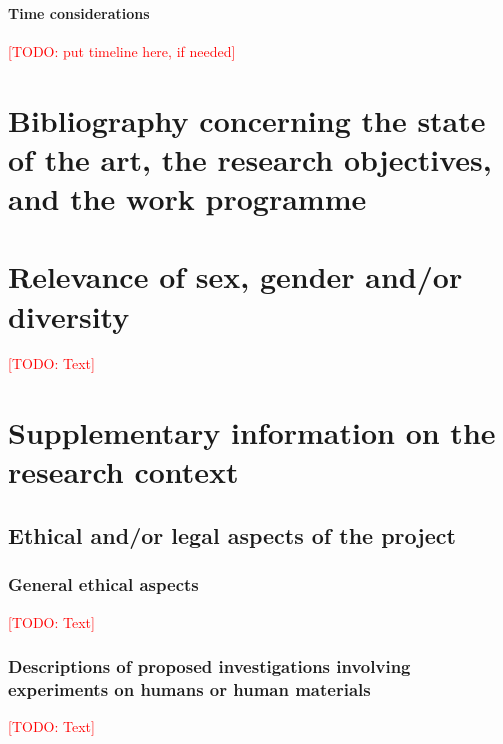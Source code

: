 \documentclass[ngerman,firsttime]{dfgproposal}
\newcommand{\todo}[1]{\xspace{\textcolor{red}{[TODO: #1]}}\xspace}
\begin{document}
	
	\paragraph*{Time considerations}
	\todo{put timeline here, if needed}
	
	
	\section{Bibliography concerning the state of the art, the research objectives, and the work programme}
	\label{sec:bib}
	\printbibliography[notcategory=reviewed, notcategory=nonreviewed, notcategory=patents_pending, notcategory=patents, heading=none]
	
	\section{Relevance of sex, gender and/or diversity}
	\todo{Text}
	
	
	\clearpage
	\section{Supplementary information on the research context}
	
	\subsection{Ethical and/or legal aspects of the project}
	
	\subsubsection{General ethical aspects}
	\todo{Text}
	
	\subsubsection{Descriptions of proposed investigations involving experiments on humans or human materials}
	\todo{Text}
	
\end{document}
